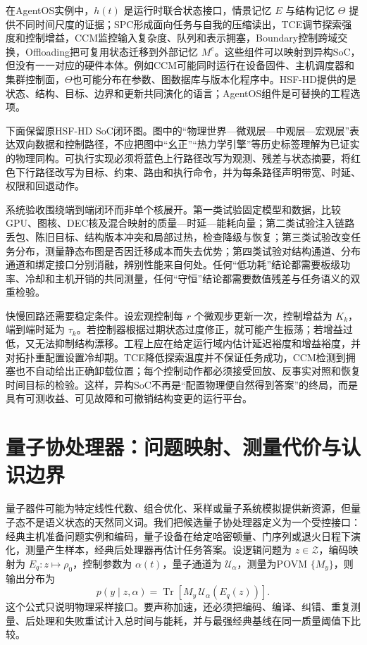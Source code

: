 在AgentOS实例中，$h(t)$ 是运行时联合状态接口，情景记忆 $E$ 与结构记忆 $\Theta$ 提供不同时间尺度的证据；SPC形成面向任务与自我的压缩读出，TCE调节探索强度和控制增益，CCM监控输入复杂度、队列和表示拥塞，Boundary控制跨域交换，Offloading把可复用状态迁移到外部记忆 $M^e$。这些组件可以映射到异构SoC，但没有一一对应的硬件本体。例如CCM可能同时运行在设备固件、主机调度器和集群控制面，$\Theta$也可能分布在参数、图数据库与版本化程序中。HSF-HD提供的是状态、结构、目标、边界和更新共同演化的语言；AgentOS组件是可替换的工程选项。

下面保留原HSF-HD SoC闭环图。图中的“物理世界—微观层—中观层—宏观层”表达双向数据和控制路径，不应把图中“幺正”“热力学引擎”等历史标签理解为已证实的物理同构。可执行实现必须将蓝色上行路径改写为观测、残差与状态摘要，将红色下行路径改写为目标、约束、路由和执行命令，并为每条路径声明带宽、时延、权限和回退动作。



系统验收围绕端到端闭环而非单个核展开。第一类试验固定模型和数据，比较GPU、图核、DEC核及混合映射的质量—时延—能耗向量；第二类试验注入链路丢包、陈旧目标、结构版本冲突和局部过热，检查降级与恢复；第三类试验改变任务分布，测量静态布图是否因迁移成本而失去优势；第四类试验对结构通道、分布通道和绑定接口分别消融，辨别性能来自何处。任何“低功耗”结论都需要板级功率、冷却和主机开销的共同测量，任何“守恒”结论都需要数值残差与任务语义的双重检验。

快慢回路还需要稳定条件。设宏观控制每 $r$ 个微观步更新一次，控制增益为 $K_k$，端到端时延为 $\tau_k$。若控制器根据过期状态过度修正，就可能产生振荡；若增益过低，又无法抑制结构漂移。工程上应在给定运行域内估计延迟裕度和增益裕度，并对拓扑重配置设置冷却期。TCE降低探索温度并不保证任务成功，CCM检测到拥塞也不自动给出正确卸载位置；每个控制动作都必须接受回放、反事实对照和恢复时间目标的检验。这样，异构SoC不再是“配置物理便自然得到答案”的终局，而是具有可测收益、可见故障和可撤销结构变更的运行平台。

\section{量子协处理器：问题映射、测量代价与认识边界}
\label{sec:section_6561}

量子器件可能为特定线性代数、组合优化、采样或量子系统模拟提供新资源，但量子态不是语义状态的天然同义词。我们把候选量子协处理器定义为一个受控接口：经典主机准备问题实例和编码，量子设备在给定哈密顿量、门序列或退火日程下演化，测量产生样本，经典后处理器再估计任务答案。设逻辑问题为 $z\in\mathcal Z$，编码映射为 $E_q:z\mapsto\rho_0$，控制参数为 $\alpha(t)$，量子通道为 $\mathcal U_{\alpha}$，测量为POVM $\{M_y\}$，则输出分布为
\[
p(y\mid z,\alpha)=\operatorname{Tr}\!\left[M_y\,
\mathcal U_{\alpha}(E_q(z))\right].
\]
这个公式只说明物理采样接口。要声称加速，还必须把编码、编译、纠错、重复测量、后处理和失败重试计入总时间与能耗，并与最强经典基线在同一质量阈值下比较。

